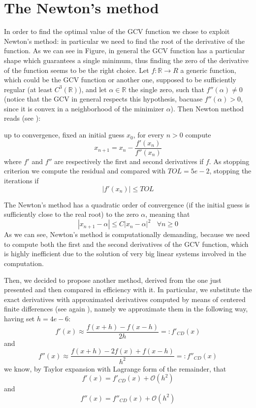\documentclass[a4paper,11 pt]{report}
\newcommand{\numberset}{\mathbb}
\newcommand{\R}{\numberset{R}}
\theoremstyle{plain}
\theoremstyle{definition}
\theoremstyle{remark}
\begin{document}
\section{The Newton's method}
In order to find the optimal value of the GCV function we chose to exploit Newton's method: in particular we need to find the root of the derivative of the function. As we can see in Figure, in general the GCV function has a particular shape which guarantees a single minimum, thus finding the zero of the derivative of the function seems to be the right choice.
Let $f: \R\rightarrow R$ a generic function, which could be the GCV function or another one, supposed to be sufficiently regular (at least $C^3(\R)$), and let $\alpha\in \R$ the single zero, such that $f''(\alpha)\neq 0$ (notice that the GCV in general respects this hypothesis, bacuase $f''(\alpha)>0$, since it is convex in a neighborhood of the minimizer $\alpha$). Then Newton method reads (see \cite{QSS}): 

up to convergence, fixed an initial guess $x_0$, for every $n>0$ compute
\begin{equation*}
x_{n+1}=x_n-\dfrac{f'(x_n)}{f''(x_n)}
\end{equation*}
where $f'$ and $f''$ are respectively the first and second derivatives if $f$.
As stopping criterion we compute the residual and compared with $TOL=5e-2$, stopping the iterations if
\begin{equation*}
|f'(x_n)|\leq TOL
\end{equation*}

The Newton's method has a quadratic order of convergence (if the initial guess is sufficiently close to the real root) to the zero $\alpha$, meaning that
\begin{equation*}
|x_{n+1}-\alpha|\leq C|x_n-\alpha|^2\ \ \ \ \forall n\geq 0
\end{equation*}
As we can see, Newton's method is computationally demanding, because we need to compute both the first and the second derivatives of the GCV function, which is highly inefficient due to the solution of very big linear systems involved in the computation. 

Then, we decided to propose another method, derived from the one just presented and then compared in efficiency with it. In particular, we substitute the exact derivatives with approximated derivatives computed by means of centered finite differences (see again \cite{QSS}), namely we approximate them in the following way, having set $h=4e-6$:
\begin{equation}
f'(x)\approx \dfrac{f(x+h)-f(x-h)}{2h}=:f'_{CD}(x)
\label{fd}
\end{equation}
and
\begin{equation}
f''(x)\approx \dfrac{f(x+h)-2f(x)+f(x-h)}{h^2}=:f''_{CD}(x)
\end{equation}
we know, by Taylor expansion with Lagrange form of the remainder, that 
\begin{equation}
f'(x)=f'_{CD}(x)+\mathcal{O}(h^2)
\label{fd2}
\end{equation}
and
\begin{equation}
f''(x)= f''_{CD}(x)+\mathcal{O}(h^2)
\label{fdd}
\end{equation}
\end{document}
